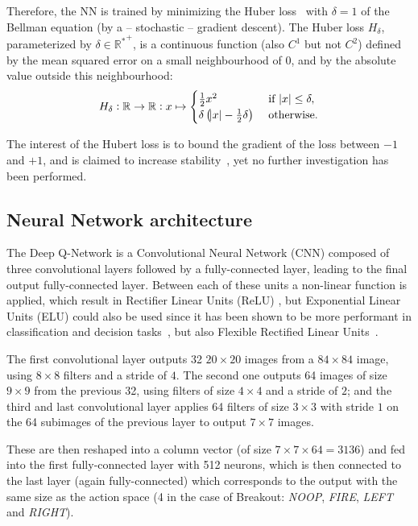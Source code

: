\documentclass[letterpaper]{article}
\begin{document}
Therefore, the NN is trained by minimizing the Huber loss~\citep{huber1964robust} with $\delta=1$ of the Bellman equation (by a -- stochastic -- gradient descent).
The Huber loss $H_\delta$, parameterized by $\delta \in {\mathbb R^*}^+$, is a continuous function (also $C^1$ but not $C^2$) defined by the mean
squared error on a small neighbourhood of $0$, and by the absolute value outside this neighbourhood:
\begin{equation}
	H_\delta : \mathbb R \to \mathbb R : x \mapsto \begin{cases}\frac 12x^2                                &\text{ if } \abs x \leq \delta,\\
	                                                            \delta\left(\abs x - \frac 12\delta\right) &\text{ otherwise.}\end{cases}
\end{equation}

The interest of the Hubert loss is to bound the gradient of the loss between $-1$ and $+1$, and is claimed to increase stability~\citep{mnih2015human},
yet no further investigation has been performed.

\subsection{Neural Network architecture}

The Deep Q-Network is a Convolutional Neural Network (CNN) composed of three convolutional layers followed by a fully-connected layer,
leading to the final output fully-connected layer.
Between each of these units a non-linear function is applied, which result in Rectifier Linear Units (ReLU) \citep{krizhevsky2012imagenet}, but Exponential Linear Units (ELU) could
also be used since it has been shown to be more performant in classification and decision tasks~\citep{DBLP:journals/corr/ClevertUH15}, but also
Flexible Rectified Linear Units~\citep{qiu2017flexible}.

The first convolutional layer outputs 32 $20 \times 20$ images from a $84 \times 84$ image, using $8 \times 8$ filters and a stride of $4$. The second one outputs
64 images of size $9 \times 9$ from the previous 32, using filters of size $4 \times 4$ and a stride of $2$; and the third and last convolutional layer
applies 64 filters of size $3 \times 3$ with stride $1$ on the 64 subimages of the previous layer to output $7 \times 7$ images.

These are then reshaped into a column vector (of size $7 \times 7 \times 64 = 3136$) and fed into the first fully-connected layer with 512 neurons,
which is then connected to the last layer (again fully-connected) which corresponds to the output with the same size as the action space (4 in the
case of Breakout: \textit{NOOP}, \textit{FIRE}, \textit{LEFT} and \textit{RIGHT}).
\end{document}
